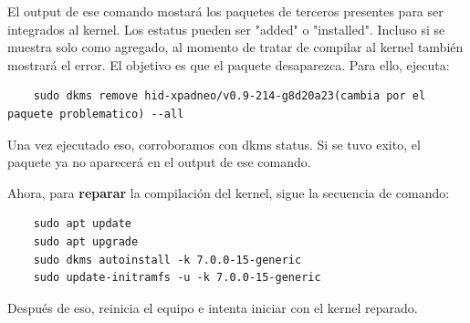 \documentclass[a4paper,10pt]{article}
\begin{document}
El output de ese comando mostará los paquetes de terceros presentes para ser integrados al kernel. Los estatus pueden ser "added" o "installed". Incluso si se muestra solo como agregado, al momento de tratar de compilar al kernel también mostrará el error. El objetivo es que el paquete desaparezca. Para ello, ejecuta:

\begin{lstlisting}
    sudo dkms remove hid-xpadneo/v0.9-214-g8d20a23(cambia por el paquete problematico) --all 
\end{lstlisting}

Una vez ejecutado eso, corroboramos con dkms status. Si se tuvo exito, el paquete ya no aparecerá en el output de ese comando.


Ahora, para \textbf{reparar} la compilación del kernel, sigue la secuencia de comando:

\begin{lstlisting}
    sudo apt update
    sudo apt upgrade
    sudo dkms autoinstall -k 7.0.0-15-generic  
    sudo update-initramfs -u -k 7.0.0-15-generic
\end{lstlisting}

Después de eso, reinicia el equipo e intenta iniciar con el kernel reparado.
\end{document}
